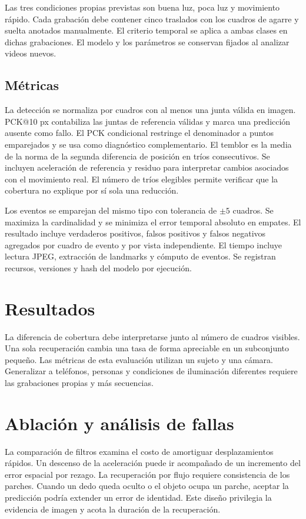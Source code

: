 \documentclass[conference]{IEEEtran}
\begin{document}
Las tres condiciones propias previstas son buena luz, poca luz y movimiento rápido. Cada grabación debe contener cinco traslados con los cuadros de agarre y suelta anotados manualmente. El criterio temporal se aplica a ambas clases en dichas grabaciones. El modelo y los parámetros se conservan fijados al analizar videos nuevos.

\subsection{Métricas}
La detección se normaliza por cuadros con al menos una junta válida en imagen. PCK@10 px contabiliza las juntas de referencia válidas y marca una predicción ausente como fallo. El PCK condicional restringe el denominador a puntos emparejados y se usa como diagnóstico complementario. El temblor es la media de la norma de la segunda diferencia de posición en tríos consecutivos. Se incluyen aceleración de referencia y residuo para interpretar cambios asociados con el movimiento real. El número de tríos elegibles permite verificar que la cobertura no explique por sí sola una reducción.

Los eventos se emparejan del mismo tipo con tolerancia de $\pm5$ cuadros. Se maximiza la cardinalidad y se minimiza el error temporal absoluto en empates. El resultado incluye verdaderos positivos, falsos positivos y falsos negativos agregados por cuadro de evento y por vista independiente. El tiempo incluye lectura JPEG, extracción de landmarks y cómputo de eventos. Se registran recursos, versiones y hash del modelo por ejecución.

\section{Resultados}

La diferencia de cobertura debe interpretarse junto al número de cuadros visibles. Una sola recuperación cambia una tasa de forma apreciable en un subconjunto pequeño. Las métricas de esta evaluación utilizan un sujeto y una cámara. Generalizar a teléfonos, personas y condiciones de iluminación diferentes requiere las grabaciones propias y más secuencias.

\section{Ablación y análisis de fallas}

La comparación de filtros examina el costo de amortiguar desplazamientos rápidos. Un descenso de la aceleración puede ir acompañado de un incremento del error espacial por rezago. La recuperación por flujo requiere consistencia de los parches. Cuando un dedo queda oculto o el objeto ocupa un parche, aceptar la predicción podría extender un error de identidad. Este diseño privilegia la evidencia de imagen y acota la duración de la recuperación.
\end{document}
